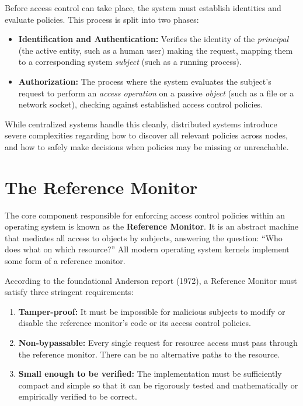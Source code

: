 Before access control can take place, the system must establish identities and evaluate policies. This process is split into two phases:
\begin{itemize}
    \item \textbf{Identification and Authentication:} Verifies the identity of the \textit{principal} (the active entity, such as a human user) making the request, mapping them to a corresponding system \textit{subject} (such as a running process).
    \item \textbf{Authorization:} The process where the system evaluates the subject's request to perform an \textit{access operation} on a passive \textit{object} (such as a file or a network socket), checking against established access control policies.
\end{itemize}

While centralized systems handle this cleanly, distributed systems introduce severe complexities regarding how to discover all relevant policies across nodes, and how to safely make decisions when policies may be missing or unreachable.

\section{The Reference Monitor}
The core component responsible for enforcing access control policies within an operating system is known as the \textbf{Reference Monitor}. It is an abstract machine that mediates all access to objects by subjects, answering the question: ``Who does what on which resource?'' All modern operating system kernels implement some form of a reference monitor.

According to the foundational Anderson report (1972), a Reference Monitor must satisfy three stringent requirements:
\begin{enumerate}
    \item \textbf{Tamper-proof:} It must be impossible for malicious subjects to modify or disable the reference monitor's code or its access control policies.
    \item \textbf{Non-bypassable:} Every single request for resource access must pass through the reference monitor. There can be no alternative paths to the resource.
    \item \textbf{Small enough to be verified:} The implementation must be sufficiently compact and simple so that it can be rigorously tested and mathematically or empirically verified to be correct.
\end{enumerate}

